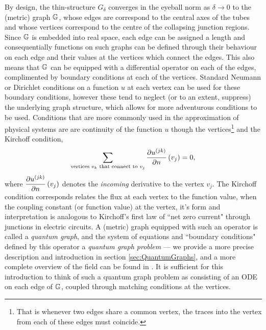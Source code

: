 By design, the thin-structure $G_{\delta}$ converges in the eyeball norm as $\delta\rightarrow0$ to the (metric) graph $\mathbb{G}$, whose edges are correspond to the central axes of the tubes and whose vertices correspond to the centre of the collapsing junction regions.
Since $\mathbb{G}$ is embedded into real space, each edge can be assigned a length and consequentially functions on such graphs can be defined through their behaviour on each edge and their values at the vertices which connect the edges.
This also means that $\mathbb{G}$ can be equipped with a differential operator on each of the edges, complimented by boundary conditions at each of the vertices.
Standard Neumann or Dirichlet conditions on a function $u$ at each vertex can be used for these boundary conditions, however these tend to neglect (or to an extent, suppress) the underlying graph structure, which allows for more adventurous conditions to be used.
Conditions that are more commonly used in the approximation of physical systems are are continuity of the function $u$ though the vertices\footnote{That is whenever two edges share a common vertex, the traces into the vertex from each of these edges must coincide.} and the Kirchoff condition,
\begin{align*}
	\sum_{\text{vertices } v_k \text{ that connect to } v_j} 
	\pdiff{u^{(jk)}}{n}\bracs{v_j} = 0, %
\end{align*}
where $\dfrac{\partial u^{(jk)}}{\partial n}\left( v_j \right)$ denotes the \emph{incoming} derivative to the vertex $v_j$. 
The Kirchoff condition corresponds relates the flux at each vertex to the function value, when the coupling constant (or function value) at the vertex, it's form and interpretation is analogous to Kirchoff's first law of ``net zero current" through junctions in electric circuits.
A (metric) graph equipped with such an operator is called a \emph{quantum graph}, and the system of equations and ``boundary conditions" defined by this operator a \emph{quantum graph problem} --- we provide a more precise description and introduction in section \ref{sec:QuantumGraphs}, and a more complete overview of the field can be found in \cite{berkolaiko2013introduction}.
It is sufficient for this introduction to think of such a quantum graph problem as consisting of an ODE on each edge of $\mathbb{G}$, coupled through matching conditions at the vertices.

